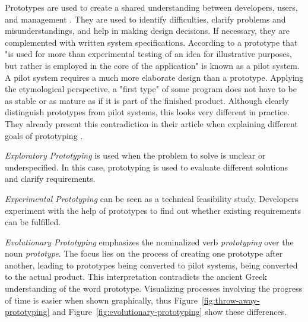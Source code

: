 Prototypes are used to create a shared understanding between developers, users, and management \cite{budde_what_1992}.
They are used to identify difficulties, clarify problems and misunderstandings, and help in making design decisions.
If necessary, they are complemented with written system specifications.
According to \cite{budde_what_1992} a prototype that "is used for more than experimental testing of an idea for illustrative purposes, but rather is employed in the core of the application" is known as a pilot system.
A pilot system requires a much more elaborate design than a prototype.
Applying the etymological perspective, a "first type" of some program does not have to be as stable or as mature as if it is part of the finished product.
Although \citeauthor{budde_what_1992} clearly distinguish prototypes from pilot systems, this looks very different in practice.
They already present this contradiction in their article when explaining different goals of prototyping \cite{budde_what_1992}.
\begin{enumerate*}[label=(\roman*)]
\item \emph{Exploratory Prototyping} is used when the problem to solve is unclear or underspecified. In this case, prototyping is used to evaluate different solutions and clarify requirements.
\item \emph{Experimental Prototyping} can be seen as a technical feasibility study. Developers experiment with the help of prototypes to find out whether existing requirements can be fulfilled.
\item \emph{Evolutionary Prototyping} emphasizes the nominalized verb \emph{prototyping} over the noun \emph{prototype}. The focus lies on the process of creating one prototype after another, leading to prototypes being converted to pilot systems, being converted to the actual product. This interpretation contradicts the ancient Greek understanding of the word prototype. Visualizing processes involving the progress of time is easier when shown graphically, thus Figure~\ref{fig:throw-away-prototyping} and Figure~\ref{fig:evolutionary-prototyping} show these differences.
\end{enumerate*}

